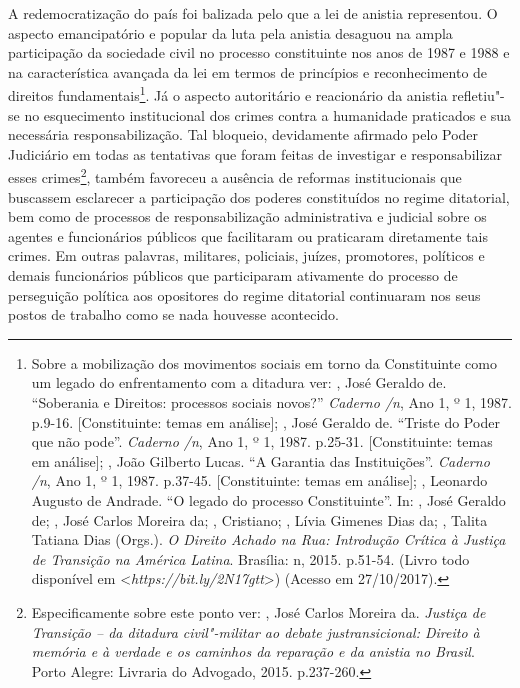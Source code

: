 A redemocratização do país foi balizada pelo que a lei de anistia
representou. O aspecto emancipatório e popular da luta pela anistia
desaguou na ampla participação da sociedade civil no processo
constituinte nos anos de 1987 e 1988 e na característica avançada da lei
em termos de princípios e reconhecimento de direitos
fundamentais\footnote{Sobre a mobilização dos movimentos sociais em
  torno da Constituinte como um legado do enfrentamento com a ditadura
  ver:  , José Geraldo de. ``Soberania e Direitos: processos
  sociais novos?'' \emph{Caderno /n}, Ano 1, º 1, 1987. p.9-16.
  {[}Constituinte: temas em análise{]};  , José Geraldo de.
  ``Triste do Poder que não pode''. \emph{Caderno /n}, Ano 1, º 1, 1987. p.25-31. {[}Constituinte: temas em análise{]}; , João
  Gilberto Lucas. ``A Garantia das Instituições''. \emph{Caderno
  /n}, Ano 1, º 1, 1987. p.37-45. {[}Constituinte: temas em
  análise{]}; , Leonardo Augusto de Andrade. ``O legado do processo
  Constituinte''. In:  ,
  José Geraldo de;  , José
  Carlos Moreira da; , Cristiano; , Lívia Gimenes Dias da;
  , Talita Tatiana Dias (Orgs.). \emph{O Direito Achado na Rua:
  Introdução Crítica à Justiça de Transição na América Latina}. Brasília:
  n, 2015. p.51-54. (Livro todo disponível em
  \textless{}\emph{https://bit.ly/2N17gtt}\textgreater{})
  (Acesso em 27/10/2017).}. Já o aspecto autoritário e reacionário
da anistia refletiu"-se no esquecimento institucional dos crimes contra a
humanidade praticados e sua necessária responsabilização. Tal bloqueio,
devidamente afirmado pelo Poder Judiciário em todas as tentativas que
foram feitas de investigar e responsabilizar esses crimes\footnote{Especificamente
  sobre este ponto ver:  , José Carlos Moreira da.
  \emph{Justiça de Transição -- da ditadura civil"-militar ao debate
  justransicional: Direito à memória e à verdade e os caminhos da
  reparação e da anistia no Brasil}. Porto Alegre: Livraria do Advogado,
  2015. p.237-260.}, também favoreceu a ausência de reformas
institucionais que buscassem esclarecer a participação dos poderes
constituídos no regime ditatorial, bem como de processos de
responsabilização administrativa e judicial sobre os agentes e
funcionários públicos que facilitaram ou praticaram diretamente tais
crimes. Em outras palavras, militares, policiais, juízes, promotores,
políticos e demais funcionários públicos que participaram ativamente do
processo de perseguição política aos opositores do regime ditatorial
continuaram nos seus postos de trabalho como se nada houvesse
acontecido.

